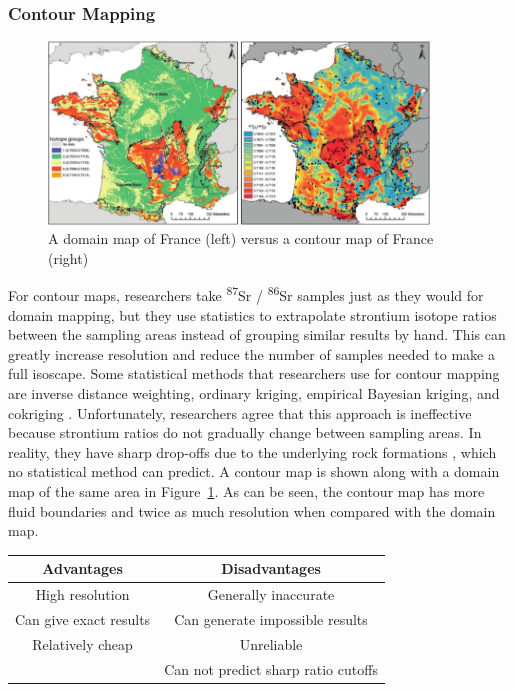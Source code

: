 \documentclass[a4paper, 12pt]{article}
\begin{document}
\subsubsection{Contour Mapping}
\begin{figure}[htbp]
    \centering
    \includegraphics[width=0.9\textwidth]{contour_mapping.jpg}
    \caption{A domain map of France (left) versus a contour map of France (right) \citep{willmes2018}}
    \label{fig:contour_mapping}
\end{figure}

For contour maps, researchers take \textsuperscript{87}Sr / \textsuperscript{86}Sr
samples just as they would for domain mapping, but they use statistics to extrapolate
strontium isotope ratios between the sampling areas instead of grouping similar results
by hand. This can greatly increase resolution and reduce the number of samples needed to make a full isoscape. Some statistical
methods that researchers use for contour mapping are inverse distance weighting, ordinary kriging, empirical Bayesian kriging,
and cokriging \citep{holt2021}. Unfortunately, researchers agree that this approach is ineffective
because strontium ratios do not gradually change between sampling areas. In reality,
they have sharp drop-offs due to the underlying rock formations \citep{holt2021}, which
no statistical method can predict. A contour map is shown along with a domain map of the same
area in Figure~\ref{fig:contour_mapping}. As can be seen, the contour map has more
fluid boundaries and twice as much resolution when compared with the domain map.

\begin{center}
    \begin{tabular}{||c | c||}
        \hline
        Advantages             & Disadvantages                       \\ [0.5ex]
        \hline\hline
        High resolution        & Generally inaccurate                \\
        \hline
        Can give exact results & Can generate impossible results     \\
        \hline
        Relatively cheap       & Unreliable                          \\
        \hline
                               & Can not predict sharp ratio cutoffs \\[1ex]
        \hline
    \end{tabular}
\end{center}
\end{document}
